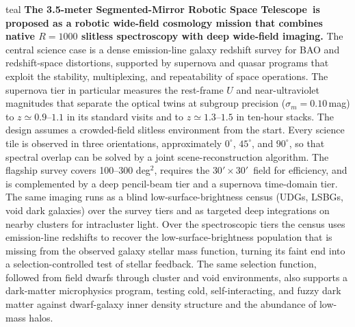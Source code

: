 \documentclass[10pt,onecolumn]{article}
\newcommand{\facility}{3.5-meter Segmented-Mirror Robotic Space Telescope}
\newcommand{\degti}{deg$^2$}
\newcommand{\kms}{km\,s$^{-1}$}
\newcommand{\fovlarge}{$30'\!\times30'$}
\begin{document}
\begin{leadbox}[title=Executive Summary]{teal}
\textbf{The \facility\ is proposed as a robotic wide-field cosmology mission that combines native $R=1000$ slitless spectroscopy with deep wide-field imaging.}
The central science case is a dense emission-line galaxy redshift survey for BAO and redshift-space distortions, supported by supernova and quasar programs that exploit the stability, multiplexing, and repeatability of space operations. The supernova tier in particular measures the rest-frame $U$ and near-ultraviolet magnitudes that separate the optical twins at subgroup precision ($\sigma_m=0.10$\,mag) to $z\simeq0.9$--$1.1$ in its standard visits and to $z\simeq1.3$--$1.5$ in ten-hour stacks. The design assumes a crowded-field slitless environment from the start. Every science tile is observed in three orientations, approximately $0^\circ$, $45^\circ$, and $90^\circ$, so that spectral overlap can be solved by a joint scene-reconstruction algorithm. The flagship survey covers 100--300 \degti, requires the \fovlarge\ field for efficiency, and is complemented by a deep pencil-beam tier and a supernova time-domain tier. The same imaging runs as a blind low-surface-brightness census (UDGs, LSBGs, void dark galaxies) over the survey tiers and as targeted deep integrations on nearby clusters for intracluster light. Over the spectroscopic tiers the census uses emission-line redshifts to recover the low-surface-brightness population that is missing from the observed galaxy stellar mass function, turning its faint end into a selection-controlled test of stellar feedback. The same selection function, followed from field dwarfs through cluster and void environments, also supports a dark-matter microphysics program, testing cold, self-interacting, and fuzzy dark matter against dwarf-galaxy inner density structure and the abundance of low-mass halos.
\end{leadbox}

\vspace{2mm}
\begin{center}
\end{center}
\end{document}
